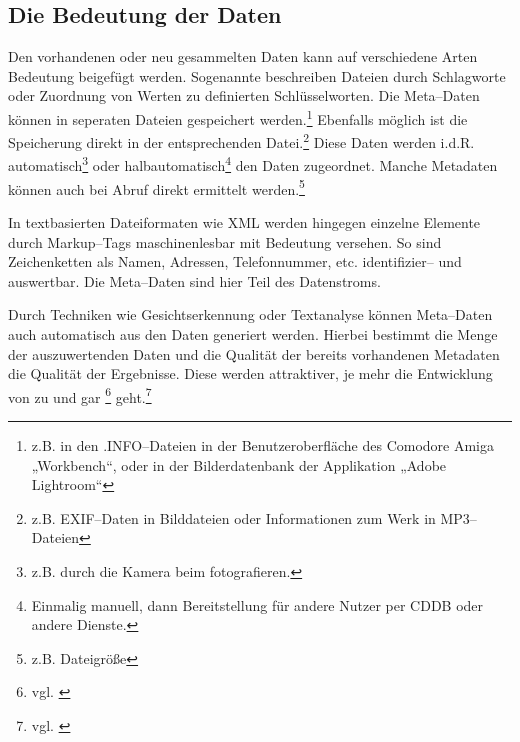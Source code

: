 \subsection{Die Bedeutung der Daten}

Den vorhandenen oder neu gesammelten Daten kann auf verschiedene Arten Bedeutung beigefügt werden. Sogenannte  beschreiben Dateien durch Schlagworte oder Zuordnung von Werten zu definierten Schlüsselworten. Die Meta--Daten können in seperaten Dateien gespeichert werden.\footnote{z.B. in den .INFO--Dateien in der Benutzeroberfläche des Comodore Amiga „Workbench“, oder in der Bilderdatenbank der Applikation „Adobe Lightroom“} Ebenfalls möglich ist die Speicherung direkt in der entsprechenden Datei.\footnote{z.B. EXIF--Daten in Bilddateien oder Informationen zum Werk in MP3--Dateien} Diese Daten werden i.d.R. automatisch\footnote{z.B. durch die Kamera beim fotografieren.} oder halbautomatisch\footnote{Einmalig manuell, dann Bereitstellung für andere Nutzer per CDDB oder andere Dienste.} den Daten zugeordnet. Manche Metadaten können auch bei Abruf direkt ermittelt werden.\footnote{z.B. Dateigröße}

In textbasierten Dateiformaten wie XML werden hingegen einzelne Elemente durch Markup--Tags maschinenlesbar mit Bedeutung versehen. So sind Zeichenketten als Namen, Adressen, Telefonnummer,  etc. identifizier-- und auswertbar. Die Meta--Daten sind hier Teil des Datenstroms.

Durch Techniken wie Gesichtserkennung oder Textanalyse können Meta--Daten auch automatisch aus den Daten generiert werden. Hierbei bestimmt die Menge der auszuwertenden Daten und die Qualität der bereits vorhandenen Metadaten die Qualität der Ergebnisse. Diese werden attraktiver, je mehr die Entwicklung von  zu  und gar \footnote{vgl. \cite{bigdikw}} geht.\footnote{vgl. \cite{faz:inng}}

